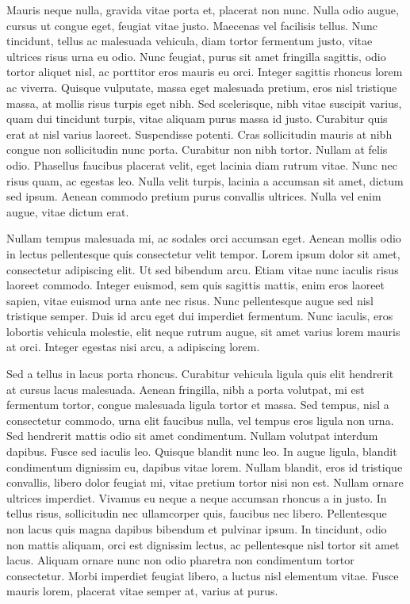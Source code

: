 Mauris neque nulla, gravida vitae porta et, placerat non nunc. Nulla odio augue, cursus ut congue eget, feugiat vitae justo. Maecenas vel facilisis tellus. Nunc tincidunt, tellus ac malesuada vehicula, diam tortor fermentum justo, vitae ultrices risus urna eu odio. Nunc feugiat, purus sit amet fringilla sagittis, odio tortor aliquet nisl, ac porttitor eros mauris eu orci. Integer sagittis rhoncus lorem ac viverra. Quisque vulputate, massa eget malesuada pretium, eros nisl tristique massa, at mollis risus turpis eget nibh. Sed scelerisque, nibh vitae suscipit varius, quam dui tincidunt turpis, vitae aliquam purus massa id justo. Curabitur quis erat at nisl varius laoreet. Suspendisse potenti. Cras sollicitudin mauris at nibh congue non sollicitudin nunc porta. Curabitur non nibh tortor. Nullam at felis odio. Phasellus faucibus placerat velit, eget lacinia diam rutrum vitae. Nunc nec risus quam, ac egestas leo. Nulla velit turpis, lacinia a accumsan sit amet, dictum sed ipsum. Aenean commodo pretium purus convallis ultrices. Nulla vel enim augue, vitae dictum erat.

Nullam tempus malesuada mi, ac sodales orci accumsan eget. Aenean mollis odio in lectus pellentesque quis consectetur velit tempor. Lorem ipsum dolor sit amet, consectetur adipiscing elit. Ut sed bibendum arcu. Etiam vitae nunc iaculis risus laoreet commodo. Integer euismod, sem quis sagittis mattis, enim eros laoreet sapien, vitae euismod urna ante nec risus. Nunc pellentesque augue sed nisl tristique semper. Duis id arcu eget dui imperdiet fermentum. Nunc iaculis, eros lobortis vehicula molestie, elit neque rutrum augue, sit amet varius lorem mauris at orci. Integer egestas nisi arcu, a adipiscing lorem.

Sed a tellus in lacus porta rhoncus. Curabitur vehicula ligula quis elit hendrerit at cursus lacus malesuada. Aenean fringilla, nibh a porta volutpat, mi est fermentum tortor, congue malesuada ligula tortor et massa. Sed tempus, nisl a consectetur commodo, urna elit faucibus nulla, vel tempus eros ligula non urna. Sed hendrerit mattis odio sit amet condimentum. Nullam volutpat interdum dapibus. Fusce sed iaculis leo. Quisque blandit nunc leo. In augue ligula, blandit condimentum dignissim eu, dapibus vitae lorem. Nullam blandit, eros id tristique convallis, libero dolor feugiat mi, vitae pretium tortor nisi non est. Nullam ornare ultrices imperdiet. Vivamus eu neque a neque accumsan rhoncus a in justo. In tellus risus, sollicitudin nec ullamcorper quis, faucibus nec libero. Pellentesque non lacus quis magna dapibus bibendum et pulvinar ipsum. In tincidunt, odio non mattis aliquam, orci est dignissim lectus, ac pellentesque nisl tortor sit amet lacus. Aliquam ornare nunc non odio pharetra non condimentum tortor consectetur. Morbi imperdiet feugiat libero, a luctus nisl elementum vitae. Fusce mauris lorem, placerat vitae semper at, varius at purus.

